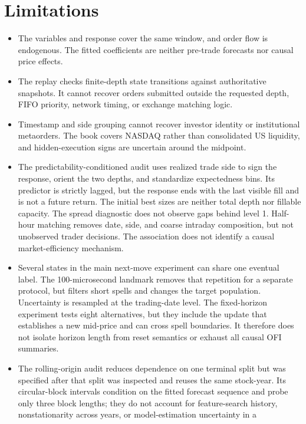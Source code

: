 \documentclass[11pt,a4paper]{article}
\begin{document}
\section{Limitations}

\begin{itemize}
  \item The variables and response cover the same window, and order flow is
  endogenous. The fitted coefficients are neither pre-trade forecasts nor
  causal price effects.
  \item The replay checks finite-depth state transitions against authoritative
  snapshots. It cannot recover orders submitted outside the requested depth,
  FIFO priority, network timing, or exchange matching logic.
  \item Timestamp and side grouping cannot recover investor identity or
  institutional metaorders. The book covers NASDAQ rather than consolidated US
  liquidity, and hidden-execution signs are uncertain around the midpoint.
  \item The predictability-conditioned audit uses realized trade side to sign
  the response, orient the two depths, and standardize expectedness bins. Its
  predictor is strictly lagged, but the response ends with the last visible
  fill and is not a future return. The initial best sizes are neither total
  depth nor fillable capacity. The spread diagnostic does not observe gaps
  behind level 1. Half-hour matching removes date, side, and coarse intraday
  composition, but not unobserved trader decisions. The association does not
  identify a causal market-efficiency mechanism.
  \item Several states in the main next-move experiment can share one eventual
  label. The 100-microsecond landmark removes that repetition for a separate
  protocol, but filters short spells and changes the target population.
  Uncertainty is resampled at the trading-date level. The fixed-horizon
  experiment tests eight alternatives, but they include the update that
  establishes a new mid-price and can cross spell boundaries. It therefore
  does not isolate horizon length from reset semantics or exhaust all causal
  OFI summaries.
  \item The rolling-origin audit reduces dependence on one terminal split but
  was specified after that split was inspected and reuses the same stock-year.
  Its circular-block intervals condition on the fitted forecast sequence and
  probe only three block lengths; they do not account for feature-search
  history, nonstationarity across years, or model-estimation uncertainty in a

\end{itemize}
\end{document}
